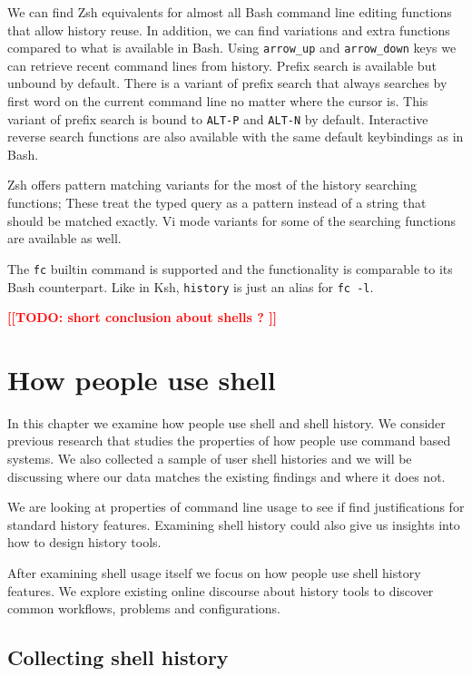 \documentclass[thesis=M,english]{FITthesis}[2012/10/20]
\newcommand{\blind}[1][1]{}
\newcommand{\todotext}[1]{\textcolor{red}{\textbf{[[#1]]}}}
\begin{document}
We can find Zsh equivalents for almost all Bash command line editing functions that allow history reuse. In addition, we can find variations and extra functions compared to what is available in Bash. Using \verb|arrow_up| and \verb|arrow_down| keys we can retrieve recent command lines from history. Prefix search is available but unbound by default. There is a variant of prefix search that always searches by first word on the current command line no matter where the cursor is. This variant of prefix search is bound to \verb|ALT-P| and \verb|ALT-N| by default. Interactive reverse search functions are also available with the same default keybindings as in Bash.

Zsh offers pattern matching variants for the most of the history searching functions; These treat the typed query as a pattern instead of a string that should be matched exactly. Vi mode variants for some of the searching functions are available as well.  

The \verb|fc| builtin command is supported and the functionality is comparable to its Bash counterpart. Like in Ksh, \verb|history| is just an alias for \verb|fc -l|. 



\blind
\todotext{TODO: short conclusion about shells ? }


\section{How people use shell}

In this chapter we examine how people use shell and shell history. We consider previous research that studies the properties of how people use command based systems. We also collected a sample of user shell histories and we will be discussing where our data matches the existing findings and where it does not. 

We are looking at properties of command line usage to see if find justifications for standard history features. Examining shell history could also give us insights into how to design history tools. 

After examining shell usage itself we focus on how people use shell history features. We explore existing online discourse about history tools to discover common workflows, problems and configurations.

\subsection{Collecting shell history}
\end{document}
